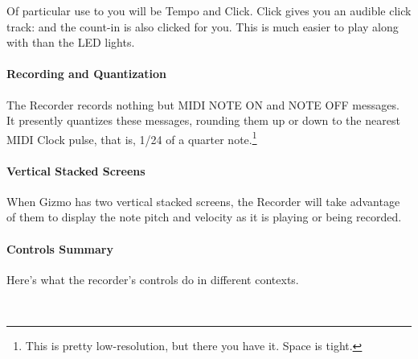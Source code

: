 \documentclass{article}
\begin{document}
\vspace{1em}
Of particular use to you will be Tempo and Click.  Click gives you an audible click track: and the count-in is also clicked for you.  This is much easier to play along with than the LED lights.

\paragraph{Recording and Quantization}

The Recorder records nothing but MIDI NOTE ON and NOTE OFF messages.  It presently quantizes these messages, rounding them up or down to the nearest MIDI Clock pulse, that is, 1/24 of a quarter note.\footnote{This is pretty low-resolution, but there you have it.  Space is tight.}

\paragraph{Vertical Stacked Screens}

When Gizmo has two vertical stacked screens, the Recorder will take advantage of them to display the note pitch and velocity as it is playing or being recorded.

\paragraph{Controls Summary}  Here's what the recorder's controls do in different contexts.


\begin{center}
\vspace{1em}
\end{center}
~		%
\end{document}
